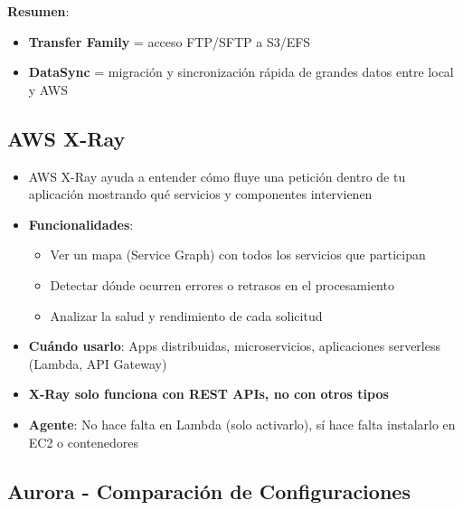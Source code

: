 \documentclass[12pt,a4paper]{report}
\newcommand{\important}[1]{\textcolor{dangerred}{\textbf{#1}}}
\begin{document}
\textbf{Resumen}:
\begin{itemize}
    \item \textbf{Transfer Family} = acceso FTP/SFTP a S3/EFS
    \item \textbf{DataSync} = migración y sincronización rápida de grandes datos entre local y AWS
\end{itemize}

\subsection{AWS X-Ray}

\begin{itemize}
    \item AWS X-Ray ayuda a entender cómo fluye una petición dentro de tu aplicación mostrando qué servicios y componentes intervienen
    \item \textbf{Funcionalidades}:
    \begin{itemize}
        \item Ver un mapa (Service Graph) con todos los servicios que participan
        \item Detectar dónde ocurren errores o retrasos en el procesamiento
        \item Analizar la salud y rendimiento de cada solicitud
    \end{itemize}
    \item \textbf{Cuándo usarlo}: Apps distribuidas, microservicios, aplicaciones serverless (Lambda, API Gateway)
    \item \important{X-Ray solo funciona con REST APIs, no con otros tipos}
    \item \textbf{Agente}: No hace falta en Lambda (solo activarlo), sí hace falta instalarlo en EC2 o contenedores
\end{itemize}

\subsection{Aurora - Comparación de Configuraciones}
\end{document}
